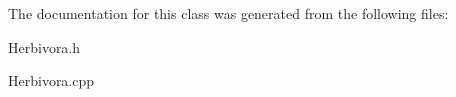The documentation for this class was generated from the following files\+:\begin{DoxyCompactItemize}
\item 
Herbivora.\+h\item 
Herbivora.\+cpp\end{DoxyCompactItemize}
